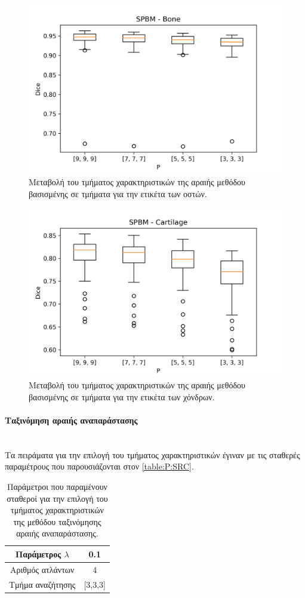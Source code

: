 \documentclass[a4paper,12pt]{article}
\newcommand{\paragraphLine}[1]{\paragraph{#1}\mbox{}\\}
\begin{document}
\begin{figure}[H]
    \centering
    \includegraphics[width=0.85\linewidth]{SPBM_P_Bone_plot.png}
    \caption{Μεταβολή του τμήματος χαρακτηριστικών της αραιής μεθόδου βασισμένης
             σε τμήματα για την ετικέτα των οστών.}
    \label{fig:SPBM:P:2}
\end{figure}

\begin{figure}[H]
    \centering
    \includegraphics[width=0.85\linewidth]{SPBM_P_Cartilage_plot.png}
    \caption{Μεταβολή του τμήματος χαρακτηριστικών της αραιής μεθόδου βασισμένης
             σε τμήματα για την ετικέτα των χόνδρων.}
    \label{fig:SPBM:P:3}
\end{figure}

\paragraphLine{Ταξινόμηση αραιής αναπαράστασης}

Τα πειράματα για την επιλογή του τμήματος χαρακτηριστικών έγιναν με τις σταθερές
παραμέτρους που παρουσιάζονται στον \autoref{table:P:SRC}.

\begin{table}[h!]
    \centering
    \begin{tabular}{|c|c|} 
        \hline
        Παράμετρος $\lambda$ & 0.1 \\ 
        \hline
        Αριθμός ατλάντων & 4 \\ 
        \hline
        Τμήμα αναζήτησης & [3,3,3] \\ 
        \hline
    \end{tabular}
    \caption{Παράμετροι που παραμένουν σταθεροί για την επιλογή του τμήματος
             χαρακτηριστικών της μεθόδου ταξινόμησης αραιής αναπαράστασης.}
    \label{table:P:SRC}
\end{table}
\end{document}

